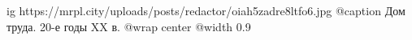  
 
 
 
 

\ifcmt
  ig https://mrpl.city/uploads/posts/redactor/oiah5zadre8ltfo6.jpg
	@caption Дом труда. 20-е годы XX в.
  @wrap center
  @width 0.9
\fi
